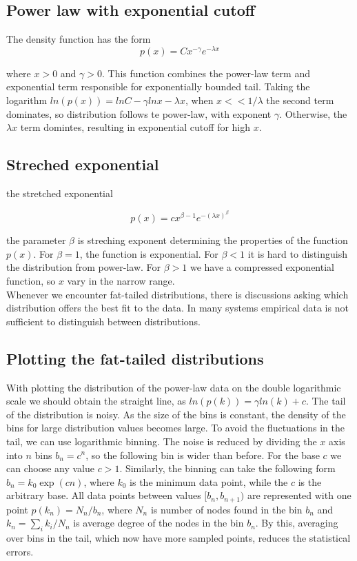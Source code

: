 \subsection{Power law with exponential cutoff}

The density function has the form
\begin{equation}
p(x) = C x^{-\gamma}e^{-\lambda x}
\end{equation}

where $x>0$ and $\gamma>0$. This function combines the power-law term and exponential term responsible for exponentially bounded tail. Taking the logarithm $ln(p(x)) = lnC - \gamma lnx - \lambda x$, when $x<<1/\lambda$ the second term dominates, so distribution follows te power-law, with exponent $\gamma$. Otherwise, the $\lambda x$ term domintes, resulting in exponential cutoff for high $x$. 

\subsection{Streched exponential}

the stretched exponential 

\begin{equation}
p(x) = c x^{\beta - 1}e^{-(\lambda x)^{\beta}}
\end{equation}

 the parameter $\beta$ is streching exponent determining the properties of the function $p(x)$. For $\beta=1$, the function is exponential. For $\beta<1$ it is hard to distinguish the distribution from power-law. For $\beta>1$ we have a compressed exponential function, so $x$ vary in the narrow range. \\

Whenever we encounter fat-tailed distributions, there is discussions asking which distribution offers the best fit to the data. In many systems empirical data is not sufficient to distinguish between distributions. 

\subsection{Plotting the fat-tailed distributions}

With plotting the distribution of the power-law data on the double logarithmic scale we should obtain the straight line, as $ln(p(k)) = \gamma ln(k) + c$. The tail of the distribution is noisy. As the size of the bins is constant, the density of the bins for large distribution values becomes large. To avoid the fluctuations in the tail, we can use logarithmic binning. The noise is reduced by dividing the $x$ axis into $n$ bins $b_n = c^n$, so the following bin is wider than before. For the base $c$ we can choose any value $c>1$. Similarly, the binning can take the following form $b_n = k_0\exp{(cn)}$, where $k_0$ is the minimum data point, while the $c$ is the arbitrary base. All data points between values $[b_n, b_{n+1})$ are represented with one point $p(k_n) = N_n/b_n$, where $N_n$ is number of nodes found in the bin $b_n$ and $k_n = \sum_i k_i / N_n$ is average degree of the nodes in the bin $b_n$. By this, averaging over bins in the tail, which now have more sampled points, reduces the statistical errors.

